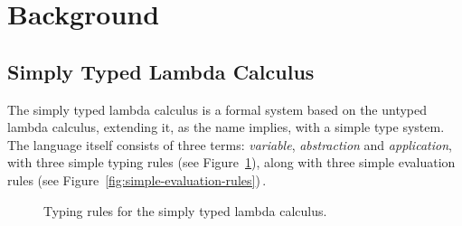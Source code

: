 \section{Background}
\label{sec:background}

\subsection{Simply Typed Lambda Calculus}
\label{sec:stlc}
The simply typed lambda calculus is a formal system based on the untyped lambda calculus, extending it, as the name implies, with a simple type system. The language itself consists of three terms: \emph{variable}, \emph{abstraction} and \emph{application}, with three simple typing rules (see Figure~\ref{fig:simple-typing-rules}), along with three simple evaluation rules (see Figure~\ref{fig:simple-evaluation-rules})\,\cite[pp. 99]{Pierce:TypeSystems}.

\begin{center}
\begin{figure}

\begin{prooftree}
\end{prooftree}

\begin{prooftree}
\end{prooftree}

\begin{prooftree}
\end{prooftree}

\caption{Typing rules for the simply typed lambda calculus.}
\label{fig:simple-typing-rules}

\end{figure}
\end{center}

